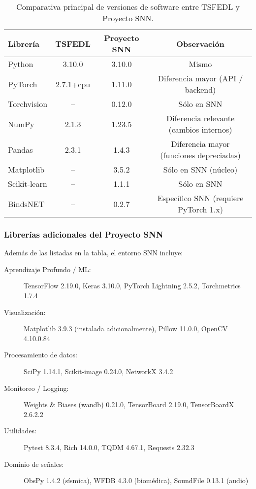 \begin{table}[htbp]
\centering
\small
\begin{tabular}{lccc}
\hline\hline
\textbf{Librería} & \textbf{TSFEDL} & \textbf{Proyecto SNN} & \textbf{Observación} \\
\hline
Python        & 3.10.0     & 3.10.0     & Mismo \\
PyTorch       & 2.7.1+cpu  & 1.11.0     & Diferencia mayor (API / backend) \\
Torchvision   & --         & 0.12.0     & Sólo en SNN \\
NumPy         & 2.1.3      & 1.23.5     & Diferencia relevante (cambios internos) \\
Pandas        & 2.3.1      & 1.4.3      & Diferencia mayor (funciones depreciadas) \\
Matplotlib    & --         & 3.5.2      & Sólo en SNN (núcleo) \\
Scikit-learn  & --         & 1.1.1      & Sólo en SNN \\
BindsNET      & --         & 0.2.7      & Específico SNN (requiere PyTorch 1.x) \\
\hline\hline
\end{tabular}
\caption{Comparativa principal de versiones de software entre TSFEDL y Proyecto SNN.}
\label{tab:comparativa_sw}
\end{table}


\subsubsection*{Librerías adicionales del Proyecto SNN}
Además de las listadas en la tabla, el entorno SNN incluye:

\begin{description}
    \item[Aprendizaje Profundo / ML:] TensorFlow 2.19.0, Keras 3.10.0, PyTorch Lightning 2.5.2, Torchmetrics 1.7.4
    \item[Visualización:] Matplotlib 3.9.3 (instalada adicionalmente), Pillow 11.0.0, OpenCV 4.10.0.84
    \item[Procesamiento de datos:] SciPy 1.14.1, Scikit-image 0.24.0, NetworkX 3.4.2
    \item[Monitoreo / Logging:] Weights \& Biases (wandb) 0.21.0, TensorBoard 2.19.0, TensorBoardX 2.6.2.2
    \item[Utilidades:] Pytest 8.3.4, Rich 14.0.0, TQDM 4.67.1, Requests 2.32.3
    \item[Dominio de señales:] ObsPy 1.4.2 (sísmica), WFDB 4.3.0 (biomédica), SoundFile 0.13.1 (audio)
\end{description}


